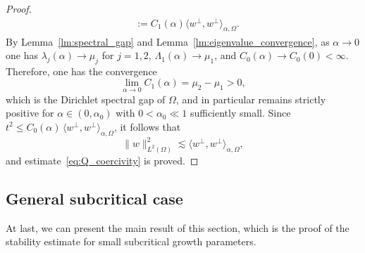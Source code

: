 \documentclass[reqno,11pt]{amsart}
\theoremstyle{definition}
\begin{document}
\begin{proof}
\begin{align*}
&:=C_1(\alpha)\langle w^\perp,w^\perp\rangle_{\alpha,\Omega}.
\end{align*}
By Lemma~\ref{lm:spectral_gap} and Lemma~\ref{lm:eigenvalue_convergence},
as $\alpha\to0$ one has $\lambda_j(\alpha)\to\mu_j$ for $j=1,2$,
$\Lambda_1(\alpha)\to\mu_1$, and $C_0(\alpha)\to C_0(0)<\infty$.
Therefore, one has the convergence
\[
\lim_{\alpha\to0}C_1(\alpha)=\mu_2-\mu_1>0,
\]
which is the Dirichlet spectral gap of $\Omega$,
and in particular remains strictly positive for $\alpha\in(0,\alpha_0)$ with $0<\alpha_0\ll1$
sufficiently small.
Since $t^2\le C_0(\alpha)\,\langle w^\perp,w^\perp\rangle_{\alpha,\Omega}$,
it follows that
\[
\|w\|_{L^2(\Omega)}^2\lesssim\langle w^\perp,w^\perp\rangle_{\alpha,\Omega},
\]
and estimate~\eqref{eq:Q_coercivity} is proved.
\end{proof}



\subsection{General subcritical case}\label{subsec:generic_deg}
    At last, we can present the main result of this section, which is the proof of the stability estimate for small subcritical growth parameters. 
\end{document}
